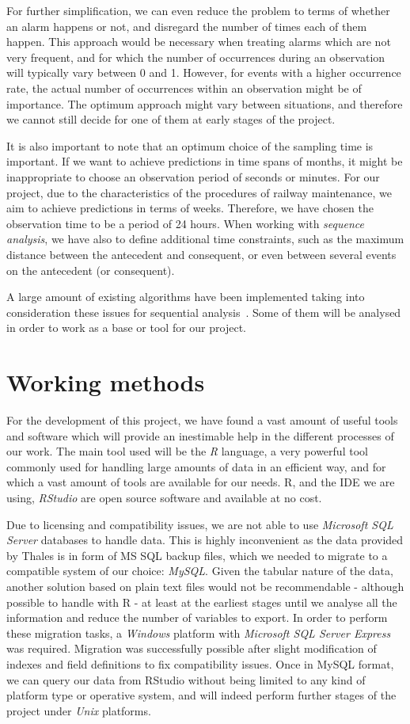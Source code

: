 \documentclass[a4paper,12pt]{article}
\begin{document}
For further simplification, we can even reduce the problem to terms of whether an alarm happens or not, and disregard the number of times each of them happen. This approach would be necessary when treating alarms which are not very frequent, and for which the number of occurrences during an observation will typically vary between 0 and 1. However, for events with a higher occurrence rate, the actual number of occurrences within an observation might be of importance. The optimum approach might vary between situations, and therefore we cannot still decide for one of them at early stages of the project.

It is also important to note that an optimum choice of the sampling time is important. If we want to achieve predictions in time spans of months, it might be inappropriate to choose an observation period of seconds or minutes. For our project, due to the characteristics of the procedures of railway maintenance, we aim to achieve predictions in terms of weeks. Therefore, we have chosen the observation time to be a period of 24 hours. When working with \emph{sequence analysis}, we have also to define additional time constraints\cite{Suh2011}, such as the maximum distance between the antecedent and consequent, or even between several events on the antecedent (or consequent).

A large amount of existing algorithms have been implemented taking into consideration these issues for sequential analysis~\cite{Wu2010}. Some of them will be analysed in order to work as a base or tool for our project.

\section{Working methods}
For the development of this project, we have found a vast amount of useful tools and software which will provide an inestimable help in the different processes of our work. The main tool used will be the \emph{R} language, a very powerful tool commonly used for handling large amounts of data in an efficient way, and for which a vast amount of tools are available for our needs. R, and the IDE we are using, \emph{RStudio} are open source software and available at no cost.

Due to licensing and compatibility issues, we are not able to use \emph{Microsoft SQL Server} databases to handle data. This is highly inconvenient as the data provided by Thales is in form of MS SQL backup files, which we needed to migrate to a compatible system of our choice: \emph{MySQL}. Given the tabular nature of the data, another solution based on plain text files would not be recommendable - although possible to handle with R - at least at the earliest stages until we analyse all the information and reduce the number of variables to export. In order to perform these migration tasks, a \emph{Windows} platform with \emph{Microsoft SQL Server Express} was required. Migration was successfully possible after slight modification of indexes and field definitions to fix compatibility issues. Once in MySQL format, we can query our data from RStudio without being limited to any kind of platform type or operative system, and will indeed perform further stages of the project under \emph{Unix} platforms.
\end{document}
